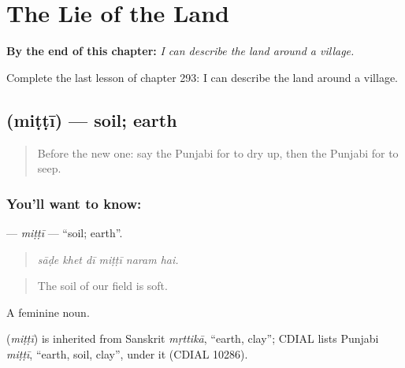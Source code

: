 
\chapter{The Lie of the Land}
\label{ch:pa-a2-the-lie-of-the-land}

\begin{chapteropening}
\textbf{By the end of this chapter:} \emph{I can describe the land around a village.}

Complete the last lesson of chapter 293: I can describe the land around a village.
\end{chapteropening}

\section[\texorpdfstring{\pa{ਮਿੱਟੀ} (miṭṭī)}{ਮਿੱਟੀ (miṭṭī)}]{ (miṭṭī) — soil; earth}

\label{lesson:PA-C293-mitti}



\begin{quote}
Before the new one: say the Punjabi for to dry up, then the Punjabi for to seep.
\end{quote}

\subsection*{You'll want to know: }
\textbf{} — \emph{miṭṭī} — \textquotedblleft{}soil; earth\textquotedblright{}.

\begin{quote}
     
\end{quote}

\begin{quote}
\emph{sāḍe khet dī miṭṭī naram hai.}
\end{quote}

\begin{quote}
The soil of our field is soft.
\end{quote}

A feminine noun.

\begin{cousinweb}
\textbf{} (\emph{miṭṭī}) is inherited from Sanskrit \emph{mṛttikā}, \textquotedblleft{}earth, clay\textquotedblright{}; CDIAL lists Punjabi \emph{miṭṭī}, \textquotedblleft{}earth, soil, clay\textquotedblright{}, under it (CDIAL 10286).
\end{cousinweb}

